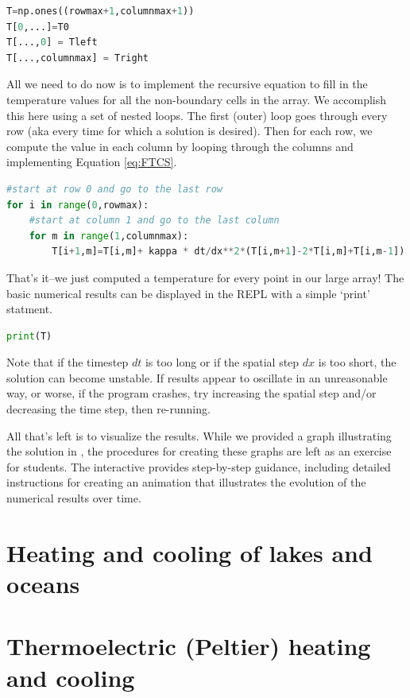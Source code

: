 \begin{lstlisting}[language=Python]
T=np.ones((rowmax+1,columnmax+1))
T[0,...]=T0
T[...,0] = Tleft
T[...,columnmax] = Tright
\end{lstlisting}

All we need to do now is to implement the recursive equation to fill in the temperature values for all the non-boundary cells in the array.  We accomplish this here using a set of nested loops.  The first (outer) loop goes through every row (aka every time for which a solution is desired).  Then for each row, we compute the value in each column by looping through the columns and implementing Equation \ref{eq:FTCS}.

\begin{lstlisting}[language=Python]
#start at row 0 and go to the last row
for i in range(0,rowmax):   
    #start at column 1 and go to the last column
    for m in range(1,columnmax):  
        T[i+1,m]=T[i,m]+ kappa * dt/dx**2*(T[i,m+1]-2*T[i,m]+T[i,m-1])
\end{lstlisting}

That's it--we just computed a temperature for every point in our large array! The basic numerical results can be displayed in the REPL with a simple `print' statment.
\begin{lstlisting}[language=Python]
print(T)
\end{lstlisting}

Note that if the timestep $dt$ is too long or if the spatial step $dx$ is too short, the solution can become unstable. If results appear to oscillate in an unreasonable way, or worse, if the program crashes, try increasing the spatial step and/or decreasing the time step, then re-running.

All that's left is to visualize the results. While we provided a graph illustrating the solution  in , the procedures for creating these graphs are left as an exercise for students. The interactive  provides step-by-step guidance, including detailed instructions for creating an animation that illustrates the evolution of the numerical results over time.

\newpage

\section{\color{gray} Heating and cooling of lakes and oceans \color{black}}
\section{\color{gray} Thermoelectric (Peltier) heating and cooling \color{black}}